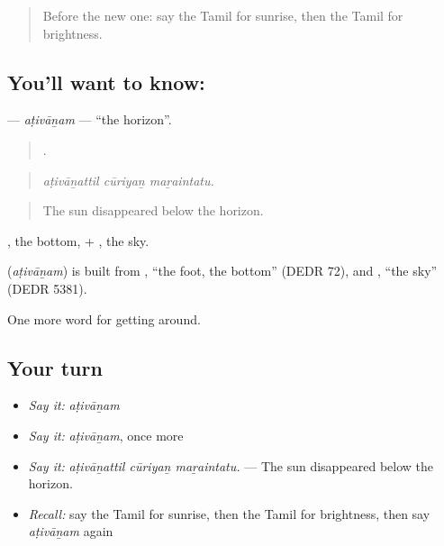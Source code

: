 \label{lesson:TA-C430-ativanam}



\begin{quote}
Before the new one: say the Tamil for sunrise, then the Tamil for brightness.
\end{quote}

\subsection*{You'll want to know: }
\textbf{} — \emph{aṭivāṉam} — \textquotedblleft{}the horizon\textquotedblright{}.

\begin{quote}
  .
\end{quote}

\begin{quote}
\emph{aṭivāṉattil cūriyaṉ maṟaintatu.}
\end{quote}

\begin{quote}
The sun disappeared below the horizon.
\end{quote}

, the bottom, + , the sky.

\begin{cousinweb}
\textbf{} (\emph{aṭivāṉam}) is built from , \textquotedblleft{}the foot, the bottom\textquotedblright{} (DEDR 72), and , \textquotedblleft{}the sky\textquotedblright{} (DEDR 5381).
\end{cousinweb}

\begin{grammarlens}[title={What you've built}]
One more word for getting around.
\end{grammarlens}

\subsection*{Your turn}
\begin{itemize}
\raggedright
  \item \emph{Say it:} \emph{aṭivāṉam}
  \item \emph{Say it:} \emph{aṭivāṉam}, once more
  \item \emph{Say it:} \emph{aṭivāṉattil cūriyaṉ maṟaintatu.} — The sun disappeared below the horizon.
  \item \emph{Recall:} say the Tamil for sunrise, then the Tamil for brightness, then say \emph{aṭivāṉam} again
\end{itemize}

